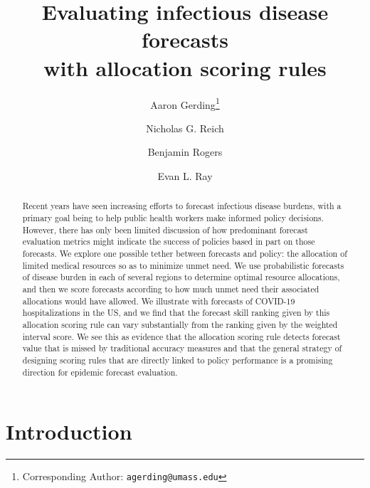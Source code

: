\documentclass{article}\usepackage[]{graphicx}\usepackage[]{xcolor}
\author{Aaron Gerding\thanks{Corresponding Author: \texttt{agerding@umass.edu}}}
\author{Nicholas G. Reich}
\author{Benjamin Rogers}
\author{Evan L. Ray}
\affil{Department of Biostatistics and Epidemiology, School of Public Health and Health
Sciences, University of Massachusetts at Amherst}
\title{Evaluating infectious disease forecasts \\ with allocation scoring rules}
\begin{document}
\newcommand{\del}[2]{\frac{\partial {#1} }{\partial {#2}} }
\newcommand{\dby}[2]{\frac{d {#1} }{d {#2}} }
\newcommand{\sbar}{\overline{s}}
\newtheorem{proposition}{Proposition}

\theoremstyle{remark}
\newtheorem*{remark}{Remark}

\maketitle







\begin{abstract}

Recent years have seen increasing efforts to forecast infectious disease burdens, with a primary goal being to help public health workers make informed policy decisions. However, there has only been limited discussion of how predominant forecast evaluation metrics might indicate the success of policies based in part on those forecasts. We explore one possible tether between forecasts and policy: the allocation of limited medical resources so as to minimize unmet need. We use probabilistic forecasts of disease burden in each of several regions to determine optimal resource allocations, and then we score forecasts according to how much unmet need their associated allocations would have allowed. We illustrate with forecasts of COVID-19 hospitalizations in the US, and we find that the forecast skill ranking given by this allocation scoring rule can vary substantially from the ranking given by the weighted interval score. We see this as evidence that the allocation scoring rule detects forecast value that is missed by traditional accuracy measures and that the general strategy of designing scoring rules that are directly linked to policy performance is a promising direction for epidemic forecast evaluation.

\end{abstract}

\section{Introduction}
\end{document}
